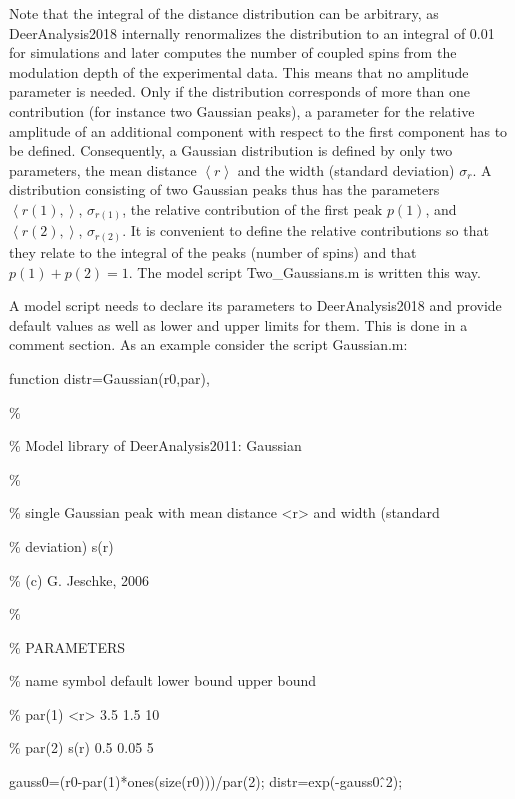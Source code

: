 \documentclass{article}
\begin{document}
Note that the integral of the distance distribution can be arbitrary, as DeerAnalysis2018 internally renormalizes the distribution to an integral of 0.01 for simulations and later computes the number of coupled spins from the modulation depth of the experimental data. This means that no amplitude parameter is needed. Only if the distribution corresponds of more than one contribution (for instance two Gaussian peaks), a parameter for the relative amplitude of an additional component with respect to the first component has to be defined. Consequently, a Gaussian distribution is defined by only two parameters, the mean distance $\left\langle r \right\rangle$ and the width (standard deviation) $\sigma_r$. A distribution consisting of two Gaussian peaks thus has the parameters $\left\langle r(1), \right\rangle$, $\sigma_{r(1)}$, the relative contribution of the first peak $p(1)$, and $\left\langle r(2), \right\rangle$, $\sigma_{r(2)}$. It is convenient to define the relative contributions so that they relate to the integral of the peaks (number of spins) and that $p(1)+p(2)=1$. The model script {\ttfamily Two\_Gaussians.m} is written this way.

A model script needs to declare its parameters to DeerAnalysis2018 and provide default values as well as lower and upper limits for them. This is done in a comment section. As an example consider the script {\ttfamily Gaussian.m}:
\vspace{10pt}

{\ttfamily \small
function distr=Gaussian(r0,par),

\%

\% Model library of DeerAnalysis2011: Gaussian

\%

\% single Gaussian peak with mean distance <r> and width (standard

\% deviation) s(r)

\% (c) G. Jeschke, 2006

\%

\% PARAMETERS

\% name    symbol default lower bound upper bound

\% par(1)  <r>    3.5     1.5         10

\% par(2)  s(r)   0.5     0.05        5

gauss0=(r0-par(1)*ones(size(r0)))/par(2);
distr=exp(-gauss0.\^\,2);   
}

\vspace{10pt}
\end{document}
